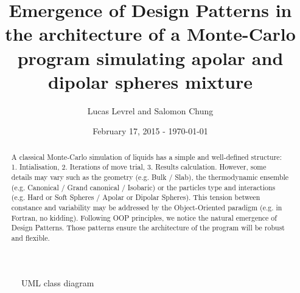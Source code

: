 \documentclass{article}
\title{Emergence of Design Patterns in the architecture of a Monte-Carlo program
    simulating apolar and dipolar spheres mixture}
\author{Lucas Levrel and Salomon Chung}
\date{February 17, 2015 - \today{}}
\begin{document}
    \maketitle

    \begin{abstract}
        A classical Monte-Carlo simulation of liquids has a simple and well-defined structure:
        1. Intialisation, 2. Iterations of move trial, 3. Results calculation.
        However, some details may vary such as the geometry (e.g. Bulk / Slab),
        the thermodynamic ensemble (e.g. Canonical / Grand canonical / Isobaric)
        or the particles type and interactions (e.g. Hard or Soft Spheres /
        Apolar or Dipolar Spheres).
        This tension between constance and variability may be addressed by
        the Object-Oriented paradigm (e.g. in Fortran, no kidding).
        Following OOP principles, we notice the natural emergence of Design Patterns.
        Those patterns ensure the architecture of the program will be robust and flexible.
    \end{abstract}

    \clearpage
    \recalctypearea
    
    \begin{figure}[htb]
        \centering
        
        \caption{UML class diagram}
    \end{figure}

    \clearpage
    \restoregeometry
    \recalctypearea

    \nocite{*}
    \printbibliography
\end{document}
